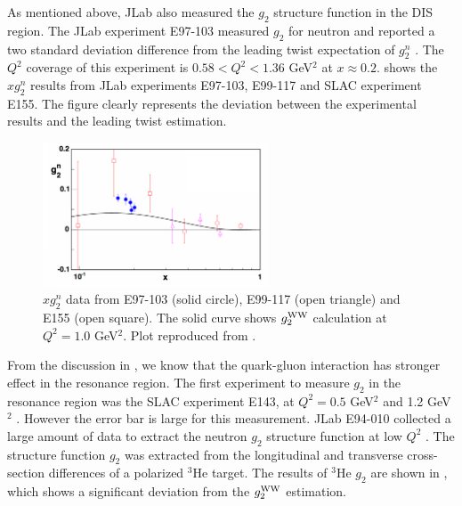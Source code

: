 As mentioned above, JLab also measured the $g_2$ structure function in the DIS region. The JLab experiment E97-103 measured $g_2$ for neutron and reported a two standard deviation difference from the leading twist expectation of $g_2^n$ \cite{Kramer2005}. The $Q^2$ coverage of this experiment is $0.58<Q^2<1.36$ GeV${}^2$ at $x\approx0.2$.  shows the $xg_2^n$ results from JLab experiments E97-103, E99-117 \cite{Zheng2004} and SLAC experiment E155. The figure clearly represents the deviation between the experimental results and the leading twist estimation.

\begin{figure}[tb!]
  \centering
  \includegraphics[width=0.6\textwidth]{figs/xg2n_E97103.png}
  \caption[$xg_2^n$ data from E97-103.]{$xg_2^n$ data from E97-103 (solid circle), E99-117 (open triangle) and E155 (open square). The solid curve shows $g_2^{\mathrm{WW}}$ calculation at $Q^2=1.0$ GeV${}^2$. Plot reproduced from \cite{Kramer2005}. \label{C4S1F2}}
\end{figure}

From the discussion in , we know that the quark-gluon interaction has stronger effect in the resonance region. The first experiment to measure $g_2$ in the resonance region was the SLAC experiment E143, at $Q^2=0.5$ GeV${}^2$ and 1.2 GeV${}^2$ \cite{Abe1998}. However the error bar is large for this measurement. JLab E94-010 collected a large amount of data to extract the neutron $g_2$ structure function at low $Q^2$ \cite{Amarian2004a}. The structure function $g_2$ was extracted from the longitudinal and transverse cross-section differences of a polarized ${}^3$He target. The results of ${}^3$He $g_2$ are shown in , which shows a significant deviation from the $g_2^{\mathrm{WW}}$ estimation.


